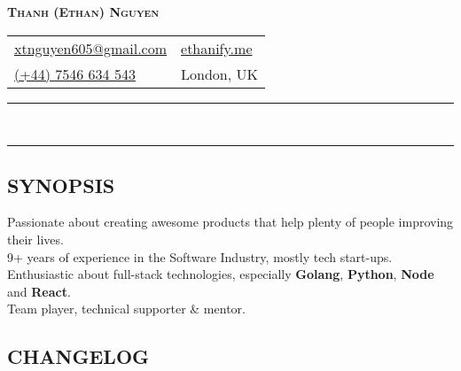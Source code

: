 \newcommand{\primary}[1]{\textcolor{primary}{\textbf{#1}}}
\newcommand{\secondary}[1]{\textcolor{secondary}{\textbf{#1}}}
\newcommand{\tertiary}[1]{\textcolor{tertiary}{#1}}
\newcommand{\tbullet}{\textcolor{tertiary}{\textbf{$\bullet$ }}}
\newcommand{\at}{\textcolor{tertiary}{\textbf{@ }}}
\newcommand{\then}{\textcolor{tertiary}{\textbf{$\Rightarrow$ }}}

\pagestyle{empty}


\setlength\parindent{0pt}
\pagecolor{background}
\color{foreground}

\begin{center}
  \textcolor{primary}{\LARGE\bfseries\scshape{Thanh (Ethan) Nguyen}}
\end{center}

\begin{tabularx}{\textwidth}{
    @{}
    >{\raggedright\arraybackslash}X
    >{\raggedleft\arraybackslash}X
    @{}
  }
  \href{mailto:xtnguyen605@gmail.com}{\textcolor{secondary}{xtnguyen605@gmail.com}} & \href{https://ethanify.me}{\textcolor{secondary}{ethanify.me}} \\
  \href{tel:447546634543}{(+44) 7546 634 543} & London, UK \\
\end{tabularx}

\begin{spacing}{0.05}
\rule{\textwidth}{1pt} \\
\rule{\textwidth}{1pt}
\end{spacing}

\subsection*{SYNOPSIS}

Passionate about creating awesome products that help plenty of people improving their lives. \\
9+ years of experience in the Software Industry, mostly tech start-ups. \\
Enthusiastic about full-stack technologies, especially \secondary{Golang}, \secondary{Python}, \secondary{Node} and \secondary{React}. \\
Team player, technical supporter \& mentor.

\subsection*{CHANGELOG}

